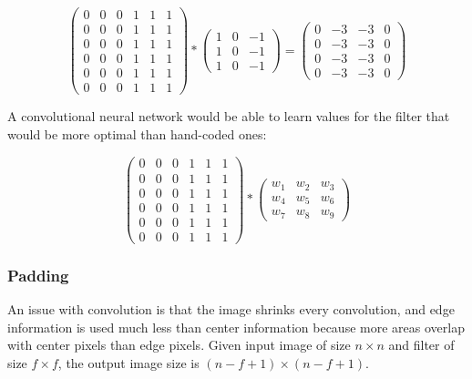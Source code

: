 \documentclass[12pt]{article}
\begin{document}
\[
    \begin{pmatrix}
        0 & 0 & 0 & 1 & 1 & 1\\
        0 & 0 & 0 & 1 & 1 & 1\\
        0 & 0 & 0 & 1 & 1 & 1\\
        0 & 0 & 0 & 1 & 1 & 1\\
        0 & 0 & 0 & 1 & 1 & 1\\
        0 & 0 & 0 & 1 & 1 & 1
    \end{pmatrix}
    *
    \begin{pmatrix}
        1 & 0 & -1\\
        1 & 0 & -1\\
        1 & 0 & -1
    \end{pmatrix}
    =
    \begin{pmatrix}
        0 & -3 & -3 & 0\\
        0 & -3 & -3 & 0\\
        0 & -3 & -3 & 0\\
        0 & -3 & -3 & 0
    \end{pmatrix}
\]

A convolutional neural network would be able to learn values for the filter that would be
more optimal than hand-coded ones:

\[
    \begin{pmatrix}
        0 & 0 & 0 & 1 & 1 & 1\\
        0 & 0 & 0 & 1 & 1 & 1\\
        0 & 0 & 0 & 1 & 1 & 1\\
        0 & 0 & 0 & 1 & 1 & 1\\
        0 & 0 & 0 & 1 & 1 & 1\\
        0 & 0 & 0 & 1 & 1 & 1
    \end{pmatrix}
    *
    \begin{pmatrix}
        w_1 & w_2 & w_3\\
        w_4 & w_5 & w_6\\
        w_7 & w_8 & w_9
    \end{pmatrix}
\]

\subsubsection{Padding}

An issue with convolution is that the image shrinks every convolution, and edge information
is used much less than center information because more areas overlap with center
pixels than edge pixels. Given input image of size $n \times n$ and filter of size $f
\times f$, the output image size is $(n-f+1) \times (n-f+1)$.
\end{document}
